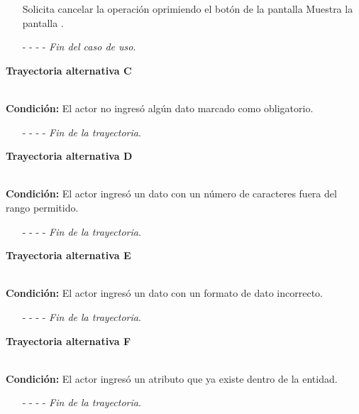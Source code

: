 \begin{enumerate}
	\UCpaso[\UCactor] Solicita cancelar la operación oprimiendo el botón  de la pantalla 
	\UCpaso[\UCsist] Muestra la pantalla .
	\item[- -] - - {\em {Fin del caso de uso}}.%
\end{enumerate}
\hypertarget{CU7-1-1:TAC}{\textbf{Trayectoria alternativa C}}\\
\noindent \textbf{Condición:} El actor no ingresó algún dato marcado como obligatorio.
\begin{enumerate}
	\UCpaso[\UCsist] Muestra el mensaje  señalando el campo que presenta el error en la pantalla .
	\UCpaso Regresa al paso \ref{CU7.1.1-P3} de la trayectoria principal.
	\item[- -] - - {\em {Fin de la trayectoria}}.%
\end{enumerate}
\hypertarget{CU7-1-1:TAD}{\textbf{Trayectoria alternativa D}}\\
\noindent \textbf{Condición:} El actor ingresó un dato con un número de caracteres fuera del rango permitido.
\begin{enumerate}
	\UCpaso[\UCsist] Muestra el mensaje  señalando el campo que presenta el error en la pantalla .
	\UCpaso Regresa al paso \ref{CU7.1.1-P3} de la trayectoria principal.
	\item[- -] - - {\em {Fin de la trayectoria}}.%
\end{enumerate}
\hypertarget{CU7-1-1:TAE}{\textbf{Trayectoria alternativa E}}\\
\noindent \textbf{Condición:} El actor ingresó un dato con un formato de dato incorrecto.
\begin{enumerate}
	\UCpaso[\UCsist] Muestra el mensaje  señalando el campo que presenta el error en la pantalla .
	\UCpaso Regresa al paso \ref{CU7.1.1-P3} de la trayectoria principal.
	\item[- -] - - {\em {Fin de la trayectoria}}.
\end{enumerate}
\hypertarget{CU7-1-1:TAF}{\textbf{Trayectoria alternativa F}}\\
\noindent \textbf{Condición:} El actor ingresó un atributo que ya existe dentro de la entidad.
\begin{enumerate}
	\UCpaso[\UCsist] Muestra el mensaje  señalando el campo que presenta la duplicidad en la pantalla .
	\UCpaso Regresa al paso \ref{CU7.1.1-P3} de la trayectoria principal.
	\item[- -] - - {\em {Fin de la trayectoria}}.
\end{enumerate}